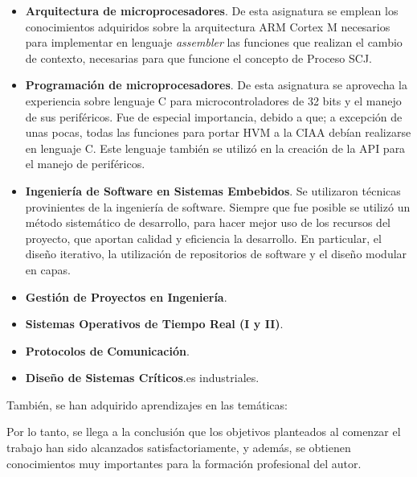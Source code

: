 \begin{itemize}
\item
\textbf{Arquitectura de microprocesadores}. De esta asignatura se emplean los conocimientos adquiridos sobre la arquitectura ARM Cortex M necesarios para implementar en lenguaje \textit{assembler} las funciones que realizan el cambio de contexto, necesarias para que funcione el concepto de Proceso SCJ. 

\item
\textbf{Programación de microprocesadores}. De esta asignatura se aprovecha la experiencia sobre lenguaje C para microcontroladores de 32 bits y el manejo de sus periféricos. Fue de especial importancia, debido a que; a excepción de unas pocas, todas las funciones para portar HVM a la CIAA debían realizarse en lenguaje C. Este lenguaje también se utilizó en la creación de  la API para el manejo de periféricos.

\item
\textbf{Ingeniería de Software en Sistemas Embebidos}. Se utilizaron técnicas provinientes de la ingeniería de software. Siempre que fue posible se utilizó un método sistemático de desarrollo, para hacer mejor uso de los recursos del proyecto, que aportan calidad y eficiencia la desarrollo. En particular, el diseño iterativo, la utilización de repositorios de software y el diseño modular en capas.

\item
\textbf{Gestión de Proyectos en Ingeniería}. %

\item
\textbf{Sistemas Operativos de Tiempo Real (I y II)}. %

\item 
\textbf{Protocolos de Comunicación}.
\item
\textbf{Diseño de Sistemas Críticos}.es industriales.
\end{itemize}



\medskip

\noindent También, se han adquirido aprendizajes en las temáticas:


\medskip

Por lo tanto, se llega a la conclusión que los objetivos planteados al comenzar el trabajo han sido alcanzados satisfactoriamente, y además, se obtienen conocimientos muy importantes para la formación profesional del autor.

